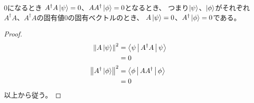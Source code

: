 \documentclass[a4paper, 10pt]{jsarticle}
\begin{document}
\begin{lem}{}{0になるとき}
	$A^\dagger A \Ket{\psi} = 0$、$A A^\dagger \Ket{\phi} = 0$となるとき、
	つまり$\Ket{\psi}$、$\Ket{\phi}$がそれぞれ
	$A^\dagger A$、$A^\dagger A$の固有値0の固有ベクトルのとき、
	$A \Ket{\psi} = 0$、$A^\dagger \Ket{\phi} = 0$である。
\end{lem}
\begin{proof}
	\begin{align}
		\left\| A \Ket{\psi} \right\|^2
		&= \Braket{\psi | A^\dagger A | \psi} \\
		&= 0 \\
		\left\| A^\dagger \Ket{\phi} \right\|^2
		&= \Braket{\phi | A A^\dagger | \phi} \\
		&= 0
	\end{align}
	以上から従う。
\end{proof}
\end{document}
